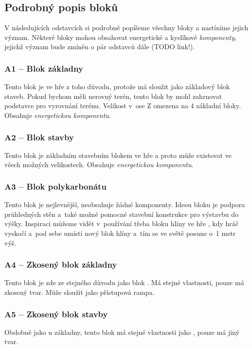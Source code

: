 \subsection{Podrobný popis bloků}

V následujících odstavcích si podrobně popíšeme všechny bloky  a nastíníme jejich význam. Některé bloky mohou obsahovat energetické a kyslíkové \textit{komponenty}, jejichž význam bude zmíněn o pár odstavců dále (TODO link!).



\subsubsection{A1 -- Blok základny}
\label{blocks:A1}
Tento blok je ve hře z toho důvodu, protože má sloužit jako základový blok staveb. Pokud bychom měli nerovný terén, tento blok by mohl zahrnovat podstavce pro vyrovnání terénu. Velikost v~ose Z omezena na 4 základní bloky. Obsahuje \textit{energetickou komponentu}.


\subsubsection{A2 -- Blok stavby}
\label{blocks:A2}
Tento blok je základním stavebním blokem ve hře a proto může existovat ve všech možných velikostech. Obsahuje \textit{energetickou komponentu}.


\subsubsection{A3 -- Blok polykarbonátu}
\label{blocks:A3}
Tento blok je nejlevnější, neobsahuje žádné komponenty. Ideou bloku je podpora průhledných stěn a~také možné pomocné stavební konstrukce pro výstavbu do výšky. Inspiraci můžeme vidět v~používání třeba bloku hlíny ve hře \MC{}, kdy hráč vyskočí a~pod sebe umístí nový blok hlíny a~tím se ve světě posune o~1 metr výš.


\subsubsection{A4 -- Zkosený blok základny}
\label{blocks:A4}
Tento blok je zde ze stejného důvodu jako blok . Má stejné vlastnosti, pouze má zkosený tvar. Může sloužit jako přístupová rampa.


\subsubsection{A5 -- Zkosený blok stavby}
\label{blocks:A5}
Obdobně jako u základny, tento blok má stejné vlastnosti jako , pouze má jiný tvar.


